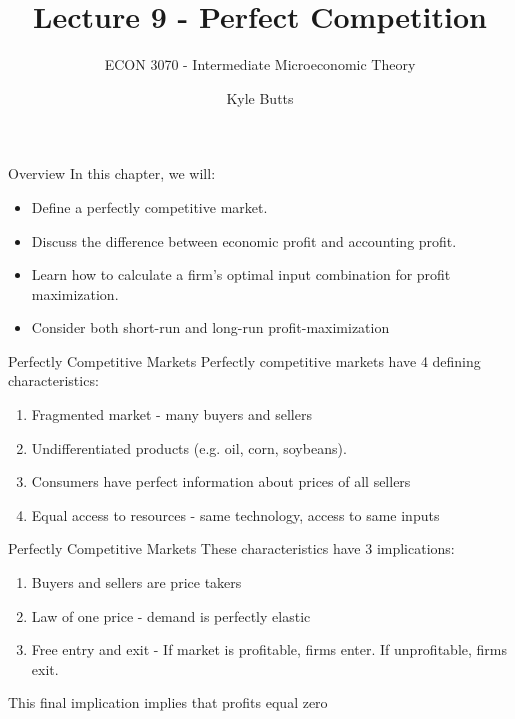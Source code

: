 \documentclass[11pt,t]{beamer}
\author{Kyle Butts}
\title{Lecture 9 - Perfect Competition}
\subtitle{ECON 3070 - Intermediate Microeconomic Theory}
\begin{document}
\begin{frame}
  \titlepage
\end{frame}

\begin{frame}{Overview}
  In this chapter, we will:

  \begin{itemize}
    \item Define a perfectly competitive market.
    
    \item Discuss the difference between economic profit and accounting profit.
    
    \item Learn how to calculate a firm's optimal input combination for profit maximization.
    
    \item Consider both short-run and long-run profit-maximization
  \end{itemize}
\end{frame}

\begin{frame}{Perfectly Competitive Markets}
  Perfectly competitive markets have 4 defining characteristics:

  \begin{enumerate}
    \item Fragmented market - many buyers and sellers
    
    \item Undifferentiated products (e.g. oil, corn, soybeans).
    
    \item Consumers have perfect information about prices of all sellers
    
    \item Equal access to resources - same technology, access to same inputs
  \end{enumerate}
\end{frame}

\begin{frame}{Perfectly Competitive Markets}
  These characteristics have 3 implications:
  \bigskip

  \begin{enumerate}
    \item Buyers and sellers are price takers
    
    \item Law of one price - demand is perfectly elastic
    
    \item Free entry and exit - If market is profitable, firms enter. If unprofitable, firms exit.
  \end{enumerate}

  \bigskip
  This final implication implies that profits equal zero
\end{frame}
\end{document}
